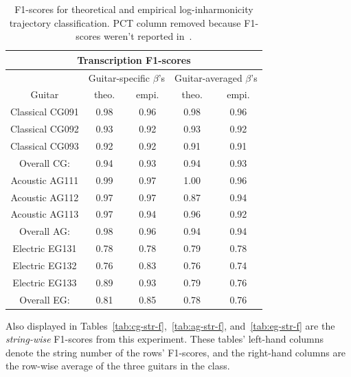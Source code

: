 \documentclass[12pt]{cmuthesis}
\begin{document}
\begin{table}[!htbp]
\begin{center}
\begin{tabular} {||c||c|c||c|c||}
\hline
\multicolumn{5}{|c|}{\bf{Transcription F1-scores}} \\
\hline
 & \multicolumn{2}{|c|}{Guitar-specific $\beta$'s} & \multicolumn{2}{|c|}{Guitar-averaged $\beta$'s}\\
\hline
Guitar & theo. & empi. & theo. & empi.\\
\hline
\hline
Classical CG091 & 0.98 & 0.96 & 0.98 & 0.96\\
\hline
Classical CG092  & 0.93 & 0.92 &  0.93 &  0.92\\
\hline
Classical CG093  & 0.92 & 0.92 &  0.91 & 0.91\\
\hline
Overall CG:  & 0.94 & 0.93 & 0.94 & 0.93\\
\hline
\hline
Acoustic AG111 & 0.99 & 0.97 &  1.00 & 0.96 \\
\hline
Acoustic AG112 & 0.97 & 0.97 &  0.87 & 0.94 \\
\hline
Acoustic AG113 & 0.97 & 0.94 & 0.96 & 0.92\\
\hline
Overall AG: & 0.98 & 0.96 & 0.94 & 0.94 \\
\hline
\hline
Electric EG131  & 0.78 & 0.78 & 0.79 & 0.78 \\
\hline
Electric EG132 & 0.76 & 0.83 & 0.76 & 0.74 \\
\hline
Electric EG133 & 0.89 & 0.93 & 0.79  & 0.76 \\
\hline
Overall EG: & 0.81 & 0.85 & 0.78 & 0.76\\
\hline
\end{tabular}
\caption{F1-scores for theoretical and empirical log-inharmonicity trajectory classification. PCT column removed because F1-scores weren't reported in~\cite{barbanchoi2012}.}
\label{tab:f-results-RWC}
\end{center}
\end{table}

Also displayed in Tables~\ref{tab:cg-str-f},~\ref{tab:ag-str-f}, and~\ref{tab:eg-str-f} are the \textit{string-wise} F1-scores from this experiment. These tables' left-hand columns denote the string number of the rows' F1-scores, and the right-hand columns are the row-wise average of the three guitars in the class.
\end{document}

